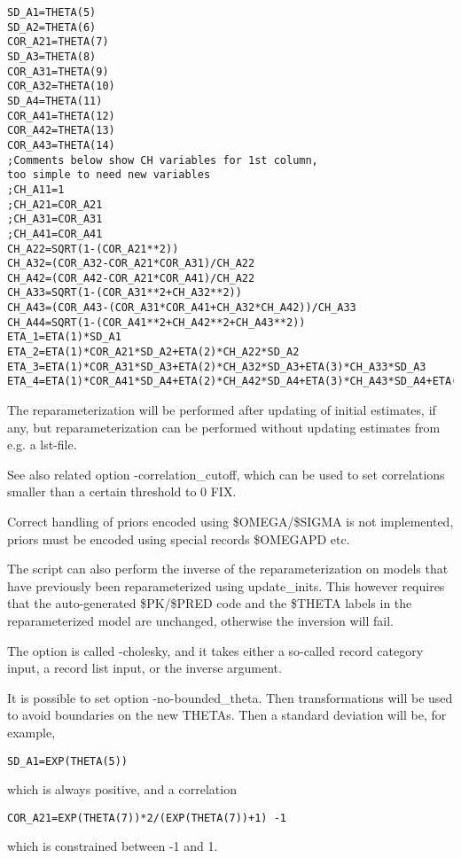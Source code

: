 \begin{verbatim}
SD_A1=THETA(5)
SD_A2=THETA(6)
COR_A21=THETA(7)
SD_A3=THETA(8)
COR_A31=THETA(9)
COR_A32=THETA(10)
SD_A4=THETA(11)
COR_A41=THETA(12)
COR_A42=THETA(13)
COR_A43=THETA(14)
;Comments below show CH variables for 1st column,
too simple to need new variables
;CH_A11=1
;CH_A21=COR_A21
;CH_A31=COR_A31
;CH_A41=COR_A41
CH_A22=SQRT(1-(COR_A21**2))
CH_A32=(COR_A32-COR_A21*COR_A31)/CH_A22
CH_A42=(COR_A42-COR_A21*COR_A41)/CH_A22
CH_A33=SQRT(1-(COR_A31**2+CH_A32**2))
CH_A43=(COR_A43-(COR_A31*COR_A41+CH_A32*CH_A42))/CH_A33
CH_A44=SQRT(1-(COR_A41**2+CH_A42**2+CH_A43**2))
ETA_1=ETA(1)*SD_A1
ETA_2=ETA(1)*COR_A21*SD_A2+ETA(2)*CH_A22*SD_A2
ETA_3=ETA(1)*COR_A31*SD_A3+ETA(2)*CH_A32*SD_A3+ETA(3)*CH_A33*SD_A3
ETA_4=ETA(1)*COR_A41*SD_A4+ETA(2)*CH_A42*SD_A4+ETA(3)*CH_A43*SD_A4+ETA(4)*CH_A44*SD_A4

\end{verbatim}

The reparameterization will be performed after updating of initial estimates, if any, but reparameterization can be performed without updating estimates from e.g. a lst-file.

See also related option -correlation\_cutoff, which can be used to set correlations smaller than a certain threshold to 0 FIX.

Correct handling of priors encoded using \$OMEGA/\$SIGMA is not implemented, priors must be encoded using special records \$OMEGAPD etc.

The script can also perform the inverse of the reparameterization on models that have previously been reparameterized using update\_inits. This however requires that the auto-generated \$PK/\$PRED code and the \$THETA labels in the reparameterized model are unchanged, otherwise the inversion will fail.

The option is called -cholesky, and it takes either a so-called record category input, a record list input, or the inverse argument.

It is possible to set option -no-bounded\_theta. Then transformations will be used to avoid boundaries on the new THETAs. Then
a standard deviation will be, for example, 
\begin{verbatim}
SD_A1=EXP(THETA(5))
\end{verbatim}
which is always positive, and a correlation
\begin{verbatim}
COR_A21=EXP(THETA(7))*2/(EXP(THETA(7))+1) -1
\end{verbatim}
which is constrained between -1 and 1. %
